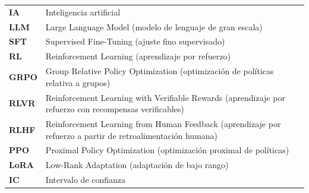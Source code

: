 
\raggedright
\setlength{\parskip}{0pt}
\renewcommand{\arraystretch}{1.25}
\noindent
\begin{tabularx}{\textwidth}{@{}>{\bfseries}p{1.6cm}>{\raggedright\arraybackslash}X@{}}
IA & Inteligencia artificial \\
LLM & Large Language Model (modelo de lenguaje de gran escala) \\
SFT & Supervised Fine-Tuning (ajuste fino supervisado) \\
RL & Reinforcement Learning (aprendizaje por refuerzo) \\
GRPO & Group Relative Policy Optimization (optimización de políticas relativa a grupos) \\
RLVR & Reinforcement Learning with Verifiable Rewards (aprendizaje por refuerzo con recompensas verificables) \\
RLHF & Reinforcement Learning from Human Feedback (aprendizaje por refuerzo a partir de retroalimentación humana) \\
PPO & Proximal Policy Optimization (optimización proximal de políticas) \\
LoRA & Low-Rank Adaptation (adaptación de bajo rango) \\
IC & Intervalo de confianza \\
\end{tabularx}
\endgroup
